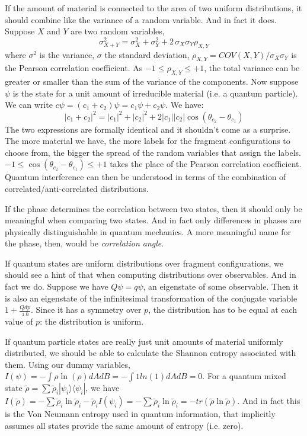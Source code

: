 \documentclass[smallextended]{svjour3}
\numberwithin{equation}{section}
\begin{document}
If the amount of material is connected to the area of two uniform distributions, it should combine like the variance of a random variable. And in fact it does. Suppose $X$ and $Y$ are two random variables,
\begin{equation}\label{eqn:correlation}
\sigma^2_{X+Y} = \sigma^2_{X} + \sigma^2_{Y} + 2 \, \sigma_{X} \sigma_{Y} \rho_{X,Y}
\end{equation}
where $\sigma^2$ is the variance, $\sigma$ the standard deviation, $\rho_{X,Y}= COV(X,Y)/\sigma_{X} \sigma_{Y}$ is the Pearson correlation coefficient. As $-1\leq\rho_{X,Y}\leq+1$, the total variance can be greater or smaller than the sum of the variance of the components. Now suppose $\psi$ is the state for a unit amount of irreducible material (i.e. a quantum particle). We can write $c \psi = (c_1 + c_2) \psi = c_1 \psi + c_2 \psi$. We have:
\begin{equation}\label{eqn:correlation_state}
|c_1+c_2|^2=|c_1|^2 + |c_2|^2 + 2 |c_1||c_2|\cos(\theta_{c_2} - \theta_{c_1})
\end{equation}
The two expressions are formally identical and it shouldn't come as a surprise. The more material we have, the more labels for the fragment configurations to choose from, the bigger the spread of the random variables that assign the labels. $-1\leq\cos(\theta_{c_2} - \theta_{c_1})\leq+1$ takes the place of the Pearson correlation coefficient. Quantum interference can then be understood in terms of the combination of correlated/anti-correlated distributions.

If the phase determines the correlation between two states, then it should only be meaningful when comparing two states. And in fact only differences in phases are physically distinguishable in quantum mechanics. A more meaningful name for the phase, then, would be \emph{correlation angle}.

If quantum states are uniform distributions over fragment configurations, we should see a hint of that when computing distributions over observables. And in fact we do. Suppose we have $Q\psi = q \psi$, an eigenstate of some observable. Then it is also an eigenstate of the infinitesimal transformation of the conjugate variable $1+\frac{Qdp}{\imath\hbar}$. Since it has a symmetry over $p$, the distribution has to be equal at each value of $p$: the distribution is uniform.

If quantum particle states are really just unit amounts of material uniformly distributed, we should be able to calculate the Shannon entropy associated with them. Using our dummy variables, $I(\psi) = - \int \rho \ln (\rho) dA dB = - \int 1 ln (1) dA dB = 0$. For a quantum mixed state $\tilde{\rho} = \sum \tilde{\rho}_i |\psi_i\rangle \langle \psi_i |$, we have $I(\tilde{\rho}) = - \sum \tilde{\rho}_i \ln \tilde{\rho}_i - \tilde{\rho}_i I(\psi_i) = - \sum \tilde{\rho}_i \ln \tilde{\rho}_i = -tr(\tilde{\rho} \ln \tilde{\rho})$. And in fact this is the Von Neumann entropy used in quantum information, that implicitly assumes all states provide the same amount of entropy (i.e. zero).
\end{document}
